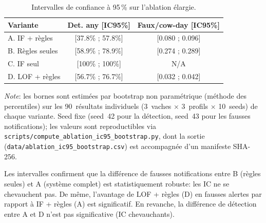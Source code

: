 \begin{table}[H]
    \centering
    \caption{Intervalles de confiance à 95\,\% sur l'ablation élargie.}
    \label{tab:ablation_ic95}
    \begin{tabular}{lcc}
        \toprule
        \textbf{Variante} & \textbf{Det. any [IC95\%]}
            & \textbf{Faux/cow-day [IC95\%]} \\
        \midrule
        A. IF + règles   & [37.8\% ; 57.8\%] & [0.080 ; 0.096] \\
        B. Règles seules & [58.9\% ; 78.9\%] & [0.274 ; 0.289] \\
        C. IF seul       & [100\% ; 100\%]   & N/A \\
        D. LOF + règles  & [56.7\% ; 76.7\%] & [0.032 ; 0.042] \\
        \bottomrule
    \end{tabular}

    \vspace{0.3em}
    \raggedright\small\textit{Note}: les bornes sont estimées par bootstrap non
    paramétrique (méthode des percentiles) sur les 90~résultats individuels
    (3~vaches $\times$ 3~profils $\times$ 10~seeds) de chaque variante. Seed
    fixe (seed~42 pour la détection, seed~43 pour les fausses notifications);
    les valeurs sont reproductibles via
    \texttt{scripts/compute\_ablation\_ic95\_bootstrap.py}, dont la sortie
    (\texttt{data/ablation\_ic95\_bootstrap.csv}) est accompagnée d'un
    manifeste SHA-256.
\end{table}

Les intervalles confirment que la différence de fausses notifications entre B (règles
seules) et A (système complet) est statistiquement robuste: les IC ne se chevauchent pas.
De même, l'avantage de LOF + règles (D) en fausses alertes par rapport à IF + règles (A)
est significatif. En revanche, la différence de détection entre A et D n'est pas
significative (IC chevauchants).


